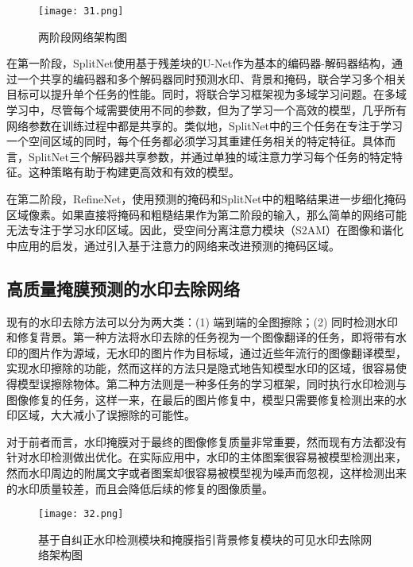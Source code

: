 \begin{figure}[!htbp]
	\centering
	\texttt{[image: 31.png]}
	\caption{两阶段网络架构图}
	\label{fig:31}
\end{figure}

在第一阶段，SplitNet使用基于残差块的U-Net作为基本的编码器-解码器结构，通过一个共享的编码器和多个解码器同时预测水印、背景和掩码，联合学习多个相关目标可以提升单个任务的性能。同时，将联合学习框架视为多域学习问题。在多域学习中，尽管每个域需要使用不同的参数，但为了学习一个高效的模型，几乎所有网络参数在训练过程中都是共享的。类似地，SplitNet中的三个任务在专注于学习一个空间区域的同时，每个任务都必须学习其重建任务相关的特定特征。具体而言，SplitNet三个解码器共享参数，并通过单独的域注意力学习每个任务的特定特征。这种策略有助于构建更高效和有效的模型。

在第二阶段，RefineNet，使用预测的掩码和SplitNet中的粗略结果进一步细化掩码区域像素。如果直接将掩码和粗糙结果作为第二阶段的输入，那么简单的网络可能无法专注于学习水印区域。因此，受空间分离注意力模块（S2AM）在图像和谐化中应用的启发，通过引入基于注意力的网络来改进预测的掩码区域。

\subsection{高质量掩膜预测的水印去除网络}

现有的水印去除方法可以分为两大类：(1) 端到端的全图擦除；(2) 同时检测水印和修复背景。第一种方法将水印去除的任务视为一个图像翻译的任务，即将带有水印的图片作为源域，无水印的图片作为目标域，通过近些年流行的图像翻译模型，实现水印擦除的功能，然而这样的方法只是隐式地告知模型水印的区域，很容易使得模型误擦除物体。第二种方法则是一种多任务的学习框架，同时执行水印检测与图像修复的任务，这样一来，在最后的图片修复中，模型只需要修复检测出来的水印区域，大大减小了误擦除的可能性。

对于前者而言，水印掩膜对于最终的图像修复质量非常重要，然而现有方法都没有针对水印检测做出优化。在实际应用中，水印的主体图案很容易被模型检测出来，然而水印周边的附属文字或者图案却很容易被模型视为噪声而忽视，这样检测出来的水印质量较差，而且会降低后续的修复的图像质量。

\begin{figure}[!htbp]
	\centering
	\texttt{[image: 32.png]}
	\caption{基于自纠正水印检测模块和掩膜指引背景修复模块的可见水印去除网络架构图}
	\label{fig:32}
\end{figure}



